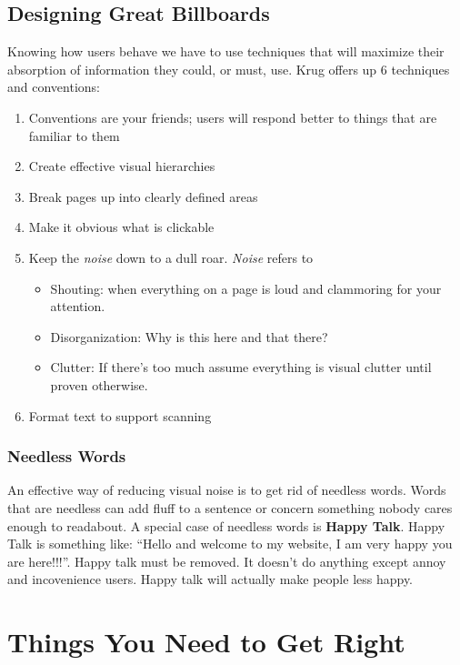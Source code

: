 \documentclass{article}%
\begin{document}
\subsection{Designing Great Billboards}
  Knowing how users behave we have to use techniques that will maximize their
  absorption of information they could, or must, use. \newline
  Krug offers up 6 techniques and conventions:
  \begin{enumerate}
    \item Conventions are your friends; users will respond better to things that are familiar to them
    \item Create effective visual hierarchies
    \item Break pages up into clearly defined areas
    \item Make it obvious what is clickable
    \item Keep the \emph{noise} down to a dull roar. \emph{Noise} refers to
      \begin{itemize}
        \item Shouting: when everything on a page is loud and clammoring for your attention.
        \item Disorganization: Why is this here and that there?
        \item Clutter: If there's too much assume everything is visual clutter until proven otherwise.
      \end{itemize}
    \item Format text to support scanning
  \end{enumerate}
  \subsubsection{Needless Words}
  An effective way of reducing visual noise is to get rid of needless words.
  Words that are needless can add fluff to a sentence or concern something nobody cares
  enough to readabout. \newline
  A special case of needless words is \textbf{Happy Talk}. Happy Talk is something like:\newline
  ``Hello and welcome to my website, I am very happy you are here!!!''. Happy talk must be removed.
  It doesn't do anything except annoy and incovenience users. Happy talk will actually make people less happy.
%
\section{Things You Need to Get Right}%
\label{sec:Things You Need to Get Right}%
\end{document}
